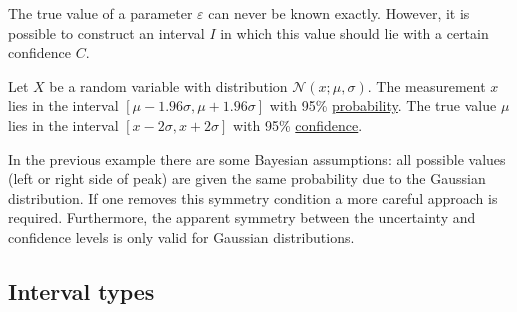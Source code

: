 {    The true value of a parameter $\varepsilon$ can never be known exactly. However, it is possible to construct an interval $I$ in which this value should lie with a certain confidence $C$.
    \begin{example}
        Let $X$ be a random variable with distribution $\mathcal{N}(x;\mu,\sigma)$. The measurement $x$ lies in the interval $[\mu - 1.96\sigma, \mu+1.96\sigma]$ with 95\% \underline{probability}. The true value $\mu$ lies in the interval $[x - 2\sigma, x+2\sigma]$ with 95\% \underline{confidence}.
    \end{example}
    \begin{remark*}
        In the previous example there are some Bayesian assumptions: all possible values (left or right side of peak) are given the same probability due to the Gaussian distribution. If one removes this symmetry condition a more careful approach is required. Furthermore, the apparent symmetry between the uncertainty and confidence levels is only valid for Gaussian distributions.
    \end{remark*}

\subsection{Interval types}



}
